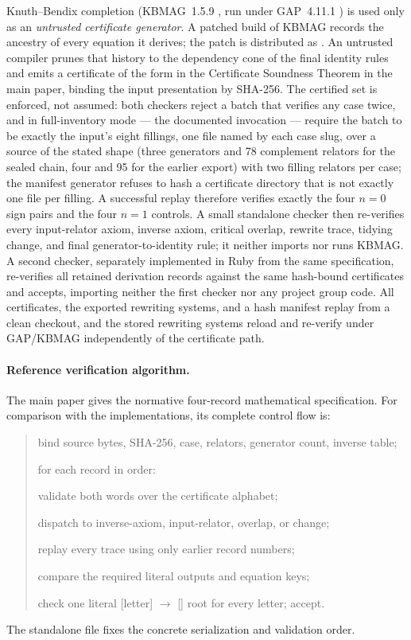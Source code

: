 \documentclass[11pt]{article}
\theoremstyle{definition}
\begin{document}
Knuth--Bendix completion (KBMAG~1.5.9 \cite{KBMAG}, run under GAP~4.11.1
\cite{GAP})
is used only as an \emph{untrusted certificate generator}. A patched
build of KBMAG records the ancestry of every equation it derives; the patch
is distributed as
. An
untrusted compiler prunes that history to the dependency cone of the
final identity rules and emits a certificate of the form in
the Certificate Soundness Theorem in the main paper, binding the input presentation by SHA-256. The
certified set is enforced, not assumed: both checkers reject a batch that
verifies any case twice, and in full-inventory mode --- the documented
invocation --- require the batch to be exactly the input's eight fillings,
one file named by each case slug, over a source of the stated shape
(three generators and 78 complement relators for the sealed chain, four and
95 for the earlier export) with two filling relators per case; the manifest
generator refuses to hash a certificate directory that is not exactly one
file per filling. A successful replay therefore verifies exactly the four
$n{=}0$ sign pairs and the four $n{=}1$ controls. A small
standalone checker then re-verifies every input-relator axiom, inverse
axiom, critical overlap, rewrite trace, tidying change, and final
generator-to-identity rule; it neither imports nor runs KBMAG. A second
checker, separately implemented in Ruby from the same specification,
re-verifies all retained
derivation records against the same hash-bound certificates and accepts,
importing neither the first checker nor any project group code. All
certificates, the exported rewriting systems, and a hash manifest replay
from a clean checkout, and the stored rewriting systems reload and
re-verify under GAP/KBMAG independently of the certificate path.

\paragraph{Reference verification algorithm.}
The main paper gives the normative four-record mathematical specification.
For comparison with the implementations, its complete control flow is:
\begin{quote}
\small\ttfamily
bind source bytes, SHA-256, case, relators, generator count, inverse table;\par
for each record in order:\par
\quad validate both words over the certificate alphabet;\par
\quad dispatch to inverse-axiom, input-relator, overlap, or change;\par
\quad replay every trace using only earlier record numbers;\par
\quad compare the required literal outputs and equation keys;\par
check one literal [letter] $\to$ [] root for every letter; accept.
\end{quote}
The standalone file
 fixes the concrete
serialization and validation order.
\end{document}
